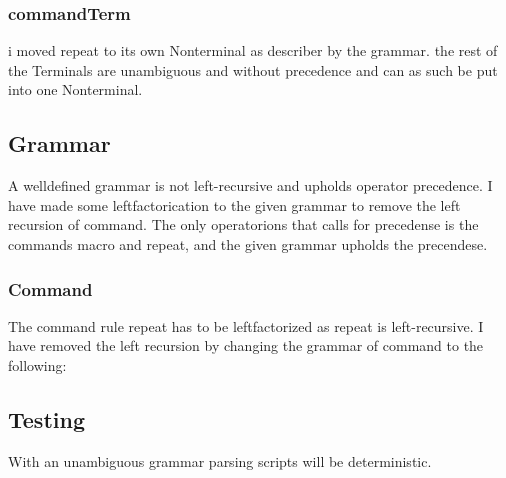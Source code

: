 \documentclass{article}
\begin{document}
\subsubsection{commandTerm}

i moved repeat to its own Nonterminal as describer by the grammar.
the rest of the Terminals are unambiguous and without precedence
and can as such be put into one Nonterminal. 

\subsection{Grammar}

A welldefined grammar is not left-recursive and upholds
operator precedence. 
I have made some leftfactorication to the given grammar to
remove the left recursion of command. The only operatorions that
calls for precedense is the commands macro and repeat, and the given 
grammar upholds the precendese.    

\subsubsection{Command}

        The command rule repeat has to be leftfactorized as 
        repeat is left-recursive.
        I have removed the left recursion by changing the grammar
        of command to the following:


                   



\subsection{Testing}
    
    With an unambiguous grammar parsing scripts will be deterministic.
\end{document}
